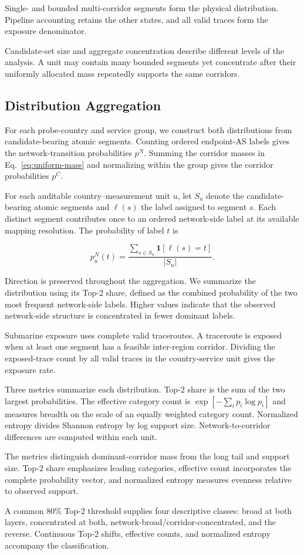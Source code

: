 Single- and bounded multi-corridor segments form the physical distribution.
Pipeline accounting retains the other states, and all valid traces form the
exposure denominator.

Candidate-set size and aggregate concentration describe different levels of
the analysis. A unit may contain many bounded segments yet concentrate after
their uniformly allocated mass repeatedly supports the same corridors.

\subsection{Distribution Aggregation}
\label{sec:framework_distribution_analysis}

For each probe-country and service group, we construct both distributions
from candidate-bearing atomic segments. Counting ordered endpoint-AS labels
gives the network-transition probabilities \(p^{N}\). Summing the corridor
masses in Eq.~\eqref{eq:uniform-mass} and normalizing within the group gives
the corridor probabilities \(p^{C}\).

For each auditable country--measurement unit \(u\), let \(S_u\) denote the
candidate-bearing atomic segments and \(\ell(s)\) the label assigned to
segment \(s\). Each distinct segment contributes once to an ordered
network-side label at its available mapping resolution. The probability of
label \(t\) is

\[
p_u^{N}(t)=
\frac{\sum_{s\in S_u}\mathbf{1}[\ell(s)=t]}
{|S_u|}.
\]

Direction is preserved throughout the aggregation. We summarize the
distribution using its Top-2 share, defined as the combined probability
of the two most frequent network-side labels. Higher values indicate
that the observed network-side structure is concentrated in fewer
dominant labels.

Submarine exposure uses complete valid traceroutes. A traceroute is exposed
when at least one segment has a feasible inter-region corridor. Dividing the
exposed-trace count by all valid traces in the country-service unit gives the
exposure rate.

Three metrics summarize each distribution. Top-2 share is the sum of the two
largest probabilities. The effective category count is
\(\exp[-\sum_i p_i\log p_i]\) and measures breadth on the scale of an equally
weighted category count. Normalized entropy divides Shannon entropy by log
support size. Network-to-corridor differences are computed within each unit.

The metrics distinguish dominant-corridor mass from the long tail and support
size. Top-2 share emphasizes leading categories, effective count incorporates
the complete probability vector, and normalized entropy measures evenness
relative to observed support.

A common 80\% Top-2 threshold supplies four descriptive classes: broad at both
layers, concentrated at both, network-broad/corridor-concentrated, and the
reverse. Continuous Top-2 shifts, effective counts, and normalized entropy
accompany the classification.
